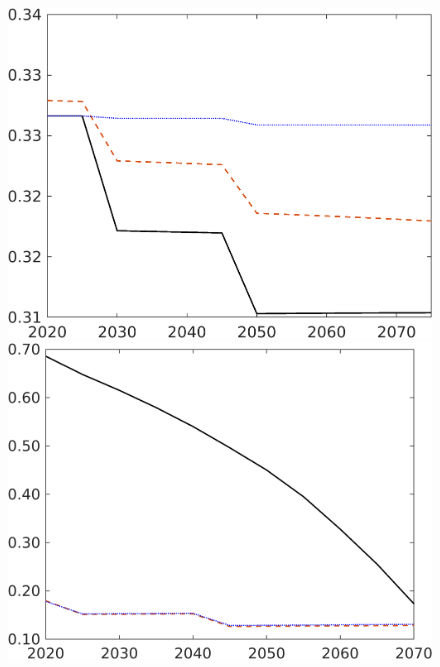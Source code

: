\begin{figure}[h!!]
\begin{minipage}[]{0.32\textwidth}
	\end{minipage}
	\begin{minipage}[]{0.32\textwidth}
		\includegraphics[width=1\textwidth]{../../codding_model/own_basedOnFried/optimalPol_190722_tidiedUp/figures/all_July22/hl_CompEffOPT_T_NoTaus_pol2_spillover0_noskill0_sep1_xgrowth0_etaa0.79_lgd0_lff0.png}
	\end{minipage}
	\begin{minipage}[]{0.32\textwidth}
		\includegraphics[width=1\textwidth]{../../codding_model/own_basedOnFried/optimalPol_190722_tidiedUp/figures/all_July22/gAagg_CompEffOPT_T_NoTaus_pol2_spillover0_noskill0_sep1_xgrowth0_etaa0.79_lgd0_lff0.png}

\end{minipage}
\end{figure}
